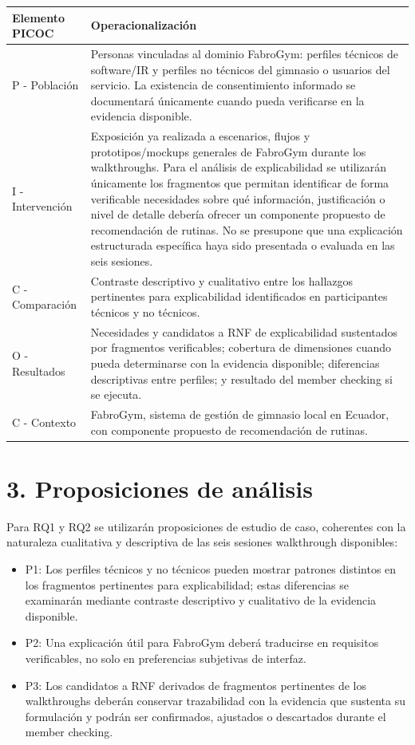 \documentclass[9pt,a4paper]{extarticle}
\begin{document}
\begin{longtable}{@{}p{}p{}@{}}
\toprule
\textbf{Elemento PICOC} & \textbf{Operacionalización} \\
\midrule
\endhead
P - Población & Personas vinculadas al dominio FabroGym: perfiles técnicos de software/IR y perfiles no técnicos del gimnasio o usuarios del servicio. La existencia de consentimiento informado se documentará únicamente cuando pueda verificarse en la evidencia disponible. \\
I - Intervención & Exposición ya realizada a escenarios, flujos y prototipos/mockups generales de FabroGym durante los walkthroughs. Para el análisis de explicabilidad se utilizarán únicamente los fragmentos que permitan identificar de forma verificable necesidades sobre qué información, justificación o nivel de detalle debería ofrecer un componente propuesto de recomendación de rutinas. No se presupone que una explicación estructurada específica haya sido presentada o evaluada en las seis sesiones. \\
C - Comparación & Contraste descriptivo y cualitativo entre los hallazgos pertinentes para explicabilidad identificados en participantes técnicos y no técnicos. \\
O - Resultados & Necesidades y candidatos a RNF de explicabilidad sustentados por fragmentos verificables; cobertura de dimensiones cuando pueda determinarse con la evidencia disponible; diferencias descriptivas entre perfiles; y resultado del member checking si se ejecuta. \\
C - Contexto & FabroGym, sistema de gestión de gimnasio local en Ecuador, con componente propuesto de recomendación de rutinas. \\
\bottomrule
\end{longtable}

\section*{3. Proposiciones de análisis}

Para RQ1 y RQ2 se utilizarán proposiciones de estudio de caso, coherentes con la naturaleza cualitativa y descriptiva de las seis sesiones walkthrough disponibles:

\begin{itemize}
\item P1: Los perfiles técnicos y no técnicos pueden mostrar patrones distintos en los fragmentos pertinentes para explicabilidad; estas diferencias se examinarán mediante contraste descriptivo y cualitativo de la evidencia disponible.
\item P2: Una explicación útil para FabroGym deberá traducirse en requisitos verificables, no solo en preferencias subjetivas de interfaz.
\item P3: Los candidatos a RNF derivados de fragmentos pertinentes de los walkthroughs deberán conservar trazabilidad con la evidencia que sustenta su formulación y podrán ser confirmados, ajustados o descartados durante el member checking.
\end{itemize}
\end{document}
